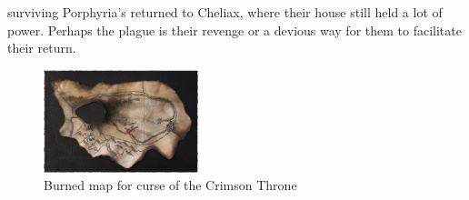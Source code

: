 surviving Porphyria's returned to Cheliax, where their house still held a lot of power. Perhaps the plague is their revenge or a devious way for them to facilitate their return. \\

\begin{figure}[h]
	\centering
	\includegraphics[width=0.4\textwidth]{images/Burned-map-for-curse-of-the-Crimson-Throne-503803899_mod.jpg}
	\caption{Burned map for curse of the Crimson Throne}
	\label{fig:Burned-map-for-curse-of-the-Crimson-Throne-503803899}
\end{figure}

